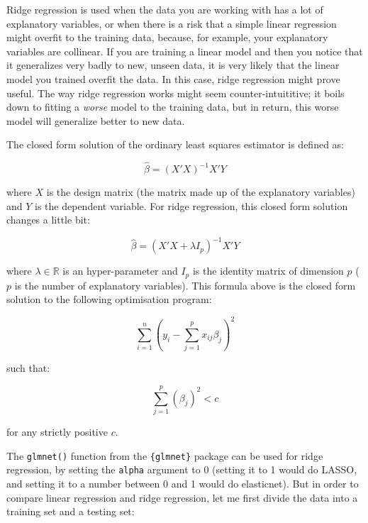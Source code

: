 \documentclass[
]{article}
\begin{document}
Ridge regression is used when the data you are working with has a lot of explanatory variables,
or when there is a risk that a simple linear regression might overfit to the training data, because,
for example, your explanatory variables are collinear.
If you are training a linear model and then you notice that it generalizes very badly to new,
unseen data, it is very likely that the linear model you trained overfit the data.
In this case, ridge regression might prove useful. The way ridge regression works might seem
counter-intuititive; it boils down to fitting a \emph{worse} model to the training data, but in return,
this worse model will generalize better to new data.

The closed form solution of the ordinary least squares estimator is defined as:

\[
\widehat{\beta} = (X'X)^{-1}X'Y
\]

where \(X\) is the design matrix (the matrix made up of the explanatory variables) and \(Y\) is the
dependent variable. For ridge regression, this closed form solution changes a little bit:

\[
\widehat{\beta} = (X'X + \lambda I_p)^{-1}X'Y
\]

where \(\lambda \in \mathbb{R}\) is an hyper-parameter and \(I_p\) is the identity matrix of dimension \(p\)
(\(p\) is the number of explanatory variables).
This formula above is the closed form solution to the following optimisation program:

\[
\sum_{i=1}^n \left(y_i - \sum_{j=1}^px_{ij}\beta_j\right)^2 
\]

such that:

\[
\sum_{j=1}^p(\beta_j)^2 < c
\]

for any strictly positive \(c\).

The \texttt{glmnet()} function from the \texttt{\{glmnet\}} package can be used for ridge regression, by setting
the \texttt{alpha} argument to 0 (setting it to 1 would do LASSO, and setting it to a number between
0 and 1 would do elasticnet). But in order to compare linear regression and ridge regression,
let me first divide the data into a training set and a testing set:
\end{document}
